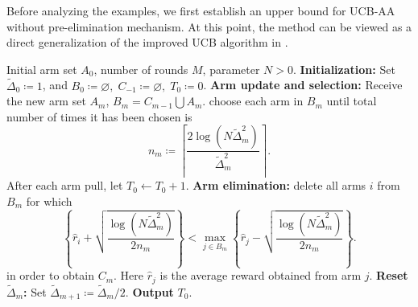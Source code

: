 \documentclass[11pt]{article}
\begin{document}
Before analyzing the examples, we first establish an upper bound for UCB-AA without pre-elimination mechanism. At this point, the method can be viewed as a direct generalization of the improved UCB algorithm in \textcite{Auer2010UCBRI}. 


\setcounter{algorithm}{2}
\begin{algorithm}[H]
\caption{\textbf{UCB-AA without pre-elimination mechanism}}
\begin{algorithmic}[1]
\Require Initial arm set $A_0$, number of rounds $M$, parameter $N>0$.
\State \textbf{Initialization:} Set $\tilde{\Delta}_0 \coloneqq 1$, and $B_0 \coloneqq \varnothing, \;C_{-1}\coloneqq\varnothing,\; T_0\coloneqq0$.
    \State
    \textbf{Arm update and selection:}
    \State \quad Receive the new arm set $A_m$, $B_m=C_{m-1}\bigcup A_m$.
        \State \quad choose each arm in $B_m$ until total number of times it has been chosen is
        \[
            n_m \coloneqq \left\lceil \frac{2\log(N\tilde{\Delta}_m^2)}{\tilde{\Delta}_m^2} \right\rceil.
        \]
        After each arm pull, let $T_0\leftarrow T_0+1$.
    \State
    \textbf{Arm elimination:}
    \State \quad delete all arms $i$ from $B_m$ for which
    \[
        \left\{ \hat{r}_i + \sqrt{\frac{\log(N\tilde{\Delta}_m^2)}{2n_m}} \right\}
        < \max_{j \in B_m} \left\{ \hat{r}_j - \sqrt{\frac{\log(N\tilde{\Delta}_m^2)}{2n_m}} \right\}.
    \]
    \State \quad in order to obtain $C_{m}$. Here $\hat{r}_j$ is the average reward obtained from arm $j$.
    \State
    \textbf{Reset $\tilde{\Delta}_m$:}
    \State \quad Set $\tilde{\Delta}_{m+1} \coloneqq \tilde{\Delta}_m / 2$.
\EndFor
    \State \textbf{Output} $T_0$.
\end{algorithmic}
\end{algorithm}
\end{document}
